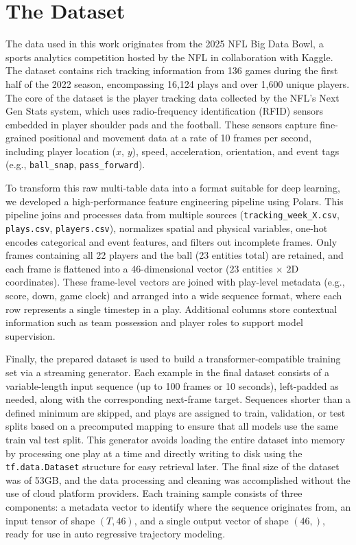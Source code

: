 \documentclass[sigconf]{acmart}
\begin{document}
\section{The Dataset}

The data used in this work originates from the 2025 NFL Big Data Bowl, a sports analytics competition hosted by the NFL in collaboration with Kaggle. The dataset contains rich tracking information from 136 games during the first half of the 2022 season, encompassing 16,124 plays and over 1,600 unique players. The core of the dataset is the player tracking data collected by the NFL's Next Gen Stats system, which uses radio-frequency identification (RFID) sensors embedded in player shoulder pads and the football. These sensors capture fine-grained positional and movement data at a rate of 10 frames per second, including player location ($x$, $y$), speed, acceleration, orientation, and event tags (e.g., \texttt{ball\_snap}, \texttt{pass\_forward}).

To transform this raw multi-table data into a format suitable for deep learning, we developed a high-performance feature engineering pipeline using Polars. This pipeline joins and processes data from multiple sources (\texttt{tracking\_week\_X.csv}, \texttt{plays.csv}, \texttt{players.csv}), normalizes spatial and physical variables, one-hot encodes categorical and event features, and filters out incomplete frames. Only frames containing all 22 players and the ball (23 entities total) are retained, and each frame is flattened into a 46-dimensional vector ($23$ entities $\times$ $2$D coordinates). These frame-level vectors are joined with play-level metadata (e.g., score, down, game clock) and arranged into a wide sequence format, where each row represents a single timestep in a play. Additional columns store contextual information such as team possession and player roles to support model supervision.

Finally, the prepared dataset is used to build a transformer-compatible training set via a streaming generator. Each example in the final dataset consists of a variable-length input sequence (up to 100 frames or 10 seconds), left-padded as needed, along with the corresponding next-frame target. Sequences shorter than a defined minimum are skipped, and plays are assigned to train, validation, or test splits based on a precomputed mapping to ensure that all models use the same train val test split. This generator avoids loading the entire dataset into memory by processing one play at a time and directly writing to disk using the \texttt{tf.data.Dataset} structure for easy retrieval later. The final size of the dataset was of 53GB, and the data processing and cleaning was accomplished without the use of cloud platform providers. Each training sample consists of three components: a metadata vector to identify where the sequence originates from, an input tensor of shape $(T, 46)$, and a single output vector of shape $(46,)$, ready for use in auto regressive trajectory modeling.
\end{document}
